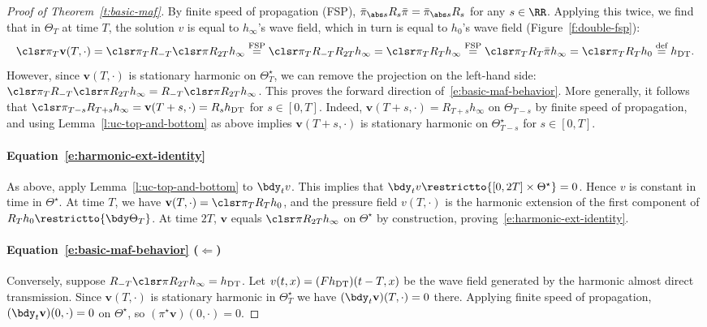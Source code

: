 \documentclass[10pt]{article}
\theoremstyle{plain}
\theoremstyle{definition}
\theoremstyle{remark}
\numberwithin{theorem}{section}
\numberwithin{example}{section}
\numberwithin{equation}{section}
\numberwithin{figure}{section}
\let\d\bdy 						%
\newcommand\DT{\ensuremath{_{\text{\normalfont DT}}}}		%
\newcommand\eqdef{\overset{\text{def}}{=}}		%
\newcommand\eqFSP{\overset{\text{FSP}}{=}}		%
\begin{document}
\begin{proof}[Proof of Theorem~\ref{t:basic-maf}]
By finite speed of propagation (FSP), $\bar\pi_{\abs s}R_s\bar\pi=\bar\pi_{\abs s}R_s$ for any $s\in\RR$.
Applying this twice, we find that in $\Theta_T$ at time $T$, the solution $v$ is equal to $h_\infty$'s wave field, which in turn is equal to $h_0$'s wave field (Figure~\ref{f:double-fsp}):
\begin{equation}
	\clsr\pi_T \mathbf v(T,\cdot) =
	\clsr\pi_T R_{-T} \clsr\pi R_{2T} h_\infty
		\eqFSP \clsr\pi_T R_{-T} R_{2T} h_\infty
		= \clsr\pi_T R_T h_\infty
		\eqFSP \clsr\pi_T R_T \bar\pi h_\infty
		= \clsr\pi_T R_Th_0
		\eqdef h\DT.
	\label{e:double-FSP}
\end{equation}
However, since $\mathbf v(T,\cdot)$ is stationary harmonic on $\Theta_T^\star$, we can remove the projection on the left-hand side: $\clsr\pi_T R_{-T} \clsr\pi R_{2T} h_\infty=R_{-T} \clsr\pi R_{2T} h_\infty$. This proves the forward direction of~\eqref{e:basic-maf-behavior}. More generally, it follows that $\clsr\pi_{T-s} R_{T+s} h_\infty=\mathbf v(T+s,\cdot)=R_s h\DT$ for $s\in[0,T]$. Indeed, $\mathbf v(T+s,\cdot)=R_{T+s} h_\infty$ on $\Theta_{T-s}$ by finite speed of propagation, and using Lemma~\ref{l:uc-top-and-bottom} as above implies $\mathbf v(T+s,\cdot)$ is stationary harmonic on $\Theta_{T-s}^\star$ for $s\in[0,T]$.

\paragraph{Equation~\eqref{e:harmonic-ext-identity}}

As above, apply Lemma~\ref{l:uc-top-and-bottom} to $\d_t v$. This implies that $\d_t v\restrictto{[0,2T]\times\Theta^\star}=0$. Hence $v$ is constant in time in $\Theta^\star$. At time $T$, we have $\mathbf v(T,\cdot)=\clsr\pi_T R_Th_0$, and the pressure field $v(T,\cdot)$ is the harmonic extension of the first component of $R_Th_0\restrictto{\bdy\Theta_T}$. At time $2T$, $\mathbf v$ equals $\clsr\pi R_{2T}h_\infty$ on $\Theta^\star$ by construction, proving~\eqref{e:harmonic-ext-identity}.

\paragraph{Equation~\eqref{e:basic-maf-behavior} ($\Leftarrow$)}

Conversely, suppose $R_{-T}\clsr\pi R_{2T} h_\infty=h\DT$.
Let $v(t,x)=(Fh\DT)(t-T,x)$ be the wave field generated by the harmonic almost direct transmission. Since $\mathbf v(T,\cdot)$ is stationary harmonic in $\Theta_T^\star$ we have $(\d_t\mathbf v)(T,\cdot)=0$ there. Applying finite speed of propagation, $(\d_t \mathbf v)(0,\cdot)=0$ on $\Theta^\star$, so $(\pi^\star \mathbf v)(0,\cdot)=0$.


\end{proof}
\end{document}

